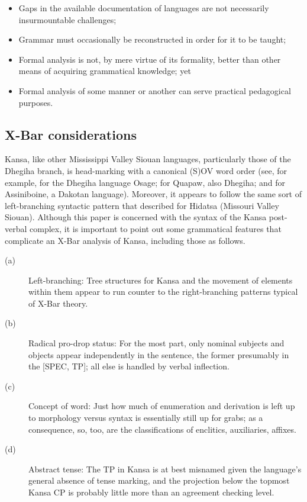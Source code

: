 \documentclass[output=paper]{LSP/langsci}
\begin{document}
\begin{itemize}
\item Gaps in the available documentation of languages are not necessarily insurmountable challenges;
\item Grammar must occasionally be reconstructed in order for it to be taught;
\item Formal analysis is not, by mere virtue of its formality, better than other means of acquiring grammatical knowledge; yet
\item Formal analysis of some manner or another can serve practical pedagogical purposes.
\end{itemize}

\subsection{X-Bar considerations}
Kansa, like other Mississippi Valley Siouan languages, particularly those of the Dhegiha branch, is head-marking with a canonical (S)OV word order (see, for example, \citet[421]{Quintero2004} for the Dhegiha language Osage; \citet[488--490]{Rankin2005} for Quapaw, also Dhegiha; and \citet[369]{Cumberland2005} for Assiniboine, a Dakotan language). Moreover, it appears to follow the same sort of left-branching syntactic pattern that \citet{Boyle2007} described for Hidatsa (Missouri Valley Siouan). Although this paper is concerned with the syntax of the Kansa post-verbal complex, it is important to point out some grammatical features that complicate an X-Bar analysis of Kansa, including those as follows.

\begin{description}
\item[(a)]	Left-branching: Tree structures for Kansa and the movement of elements within them appear to run counter to the right-branching patterns typical of X-Bar theory.

\item[(b)]	Radical pro-drop status: For the most part, only nominal subjects and objects appear independently in the sentence, the former presumably in the [SPEC, TP]; all else is handled by verbal inflection. 

\item[(c)]	Concept of word: Just how much of enumeration and derivation is left up to morphology versus syntax is essentially still up for grabs; as a consequence, so, too, are the classifications of enclitics, auxiliaries, affixes. 

\item[(d)]	Abstract tense: The TP in Kansa is at best misnamed given the language's general absence of tense marking, and the projection below the topmost Kansa CP is probably little more than an agreement checking level.
\end{description}
\end{document}
